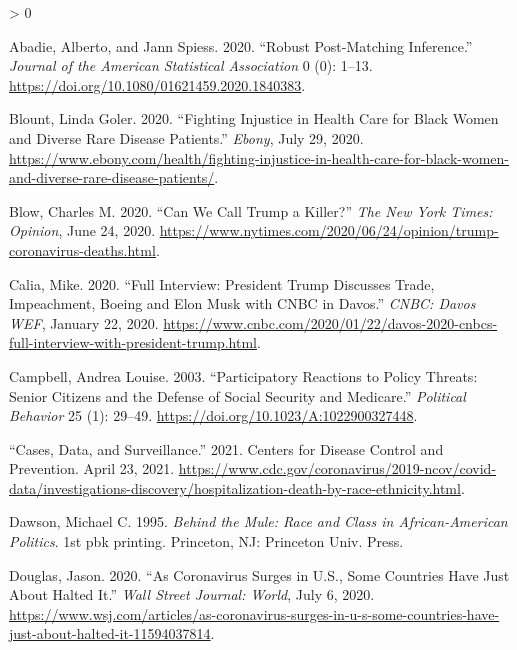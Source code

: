 \documentclass[
  12pt,
]{article}
\newlength{\cslhangindent}
\newenvironment{CSLReferences}[2] %
 {%
  \setlength{\parindent}{0pt}
  \ifodd #1 \everypar{\setlength{\hangindent}{\cslhangindent}}\ignorespaces\fi
  \ifnum #2 > 0
  \setlength{\parskip}{#2\baselineskip}
  \fi
 }%
 {}
\begin{document}
\hypertarget{refs}{}
\begin{CSLReferences}{1}{0}
\leavevmode\hypertarget{ref-Abadie2020}{}%
Abadie, Alberto, and Jann Spiess. 2020. {``Robust {Post}-{Matching Inference}.''} \emph{Journal of the American Statistical Association} 0 (0): 1--13. \url{https://doi.org/10.1080/01621459.2020.1840383}.

\leavevmode\hypertarget{ref-Blount2020}{}%
Blount, Linda Goler. 2020. {``Fighting {Injustice} in {Health Care} for {Black Women} and {Diverse Rare Disease Patients}.''} \emph{Ebony}, July 29, 2020. \url{https://www.ebony.com/health/fighting-injustice-in-health-care-for-black-women-and-diverse-rare-disease-patients/}.

\leavevmode\hypertarget{ref-Blow2020}{}%
Blow, Charles M. 2020. {``Can {We Call Trump} a {Killer}?''} \emph{The New York Times: Opinion}, June 24, 2020. \url{https://www.nytimes.com/2020/06/24/opinion/trump-coronavirus-deaths.html}.

\leavevmode\hypertarget{ref-Calia2020}{}%
Calia, Mike. 2020. {``Full Interview: {President Trump} Discusses Trade, Impeachment, {Boeing} and {Elon Musk} with {CNBC} in {Davos}.''} \emph{CNBC: Davos WEF}, January 22, 2020. \url{https://www.cnbc.com/2020/01/22/davos-2020-cnbcs-full-interview-with-president-trump.html}.

\leavevmode\hypertarget{ref-Campbell2003a}{}%
Campbell, Andrea Louise. 2003. {``Participatory {Reactions} to {Policy Threats}: {Senior Citizens} and the {Defense} of {Social Security} and {Medicare}.''} \emph{Political Behavior} 25 (1): 29--49. \url{https://doi.org/10.1023/A:1022900327448}.

\leavevmode\hypertarget{ref-cdc2021}{}%
{``Cases, {Data}, and {Surveillance}.''} 2021. {Centers for Disease Control and Prevention}. April 23, 2021. \url{https://www.cdc.gov/coronavirus/2019-ncov/covid-data/investigations-discovery/hospitalization-death-by-race-ethnicity.html}.

\leavevmode\hypertarget{ref-Dawson1995}{}%
Dawson, Michael C. 1995. \emph{Behind the Mule: Race and Class in {African}-{American} Politics}. 1st pbk printing. {Princeton, NJ}: {Princeton Univ. Press}.

\leavevmode\hypertarget{ref-Douglas2020}{}%
Douglas, Jason. 2020. {``As {Coronavirus Surges} in {U}.{S}., {Some Countries Have Just About Halted It}.''} \emph{Wall Street Journal: World}, July 6, 2020. \url{https://www.wsj.com/articles/as-coronavirus-surges-in-u-s-some-countries-have-just-about-halted-it-11594037814}.


\end{CSLReferences}
\end{document}
